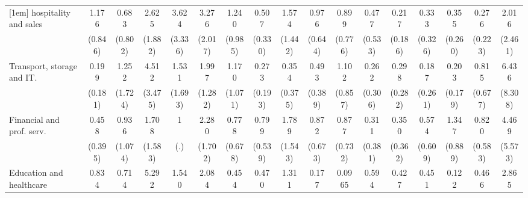 {\begin{tabular}{l*{16}{c}}
[1em]
hospitality and sales&       1.176         &       0.683         &       2.625         &       3.624         &       3.276         &       1.240         &       0.507         &       1.574         &       0.976         &       0.899         &       0.477         &       0.217         &       0.333         &       0.355         &       0.276         &       2.016         \\
                    &     (0.846)         &     (0.802)         &     (1.882)         &     (3.336)         &     (2.017)         &     (0.985)         &     (0.330)         &     (1.442)         &     (0.644)         &     (0.776)         &     (0.533)         &     (0.186)         &     (0.326)         &     (0.260)         &     (0.223)         &     (2.461)         \\
[1em]
Transport, storage and IT.&       0.199         &       1.252         &       4.512         &       1.531         &       1.997         &       1.170         &       0.273         &       0.354         &       0.493         &       1.102         &       0.262         &       0.298         &       0.187         &       0.203         &       0.815         &       6.436         \\
                    &     (0.181)         &     (1.724)         &     (3.475)         &     (1.693)         &     (1.282)         &     (1.071)         &     (0.193)         &     (0.375)         &     (0.389)         &     (0.857)         &     (0.306)         &     (0.282)         &     (0.261)         &     (0.179)         &     (0.677)         &     (8.308)         \\
[1em]
Financial and prof. serv.&       0.458         &       0.936         &       1.708         &           1         &       2.280         &       0.778         &       0.799         &       1.789         &       0.872         &       0.877         &       0.311         &       0.350         &       0.574         &       1.347         &       0.820         &       4.469         \\
                    &     (0.395)         &     (1.074)         &     (1.583)         &         (.)         &     (1.702)         &     (0.678)         &     (0.539)         &     (1.543)         &     (0.673)         &     (0.732)         &     (0.381)         &     (0.362)         &     (0.609)         &     (0.889)         &     (0.583)         &     (5.573)         \\
[1em]
Education and healthcare&       0.834         &       0.714         &       5.292\sym{*}  &       1.540         &       2.084         &       0.454         &       0.470         &       1.311         &       0.177         &      0.0965\sym{*}  &       0.594         &       0.427         &       0.451         &       0.122\sym{*}  &       0.466         &       2.865         \\

\end{tabular}}
